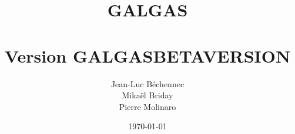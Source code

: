 \documentclass [a4paper, 10pt, openany] {book}
\begin{document}
 


\title{\Huge{\textbf{GALGAS}}\\~\\ \normalsize{Version GALGASBETAVERSION}}
\author{Jean-Luc Béchennec\\Mikaël Briday\\Pierre Molinaro}
\date \today 

\maketitle


\tableofcontents
 
\end{document}
